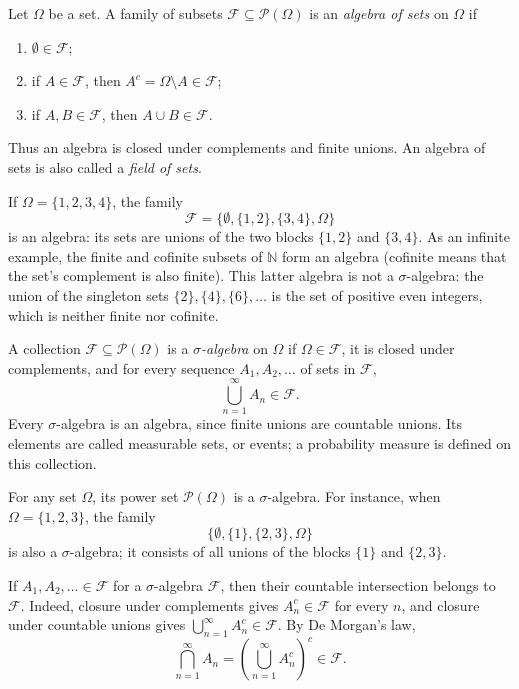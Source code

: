 \documentclass[a4paper,11pt,abstracton]{scrartcl}
\theoremstyle{dotlessP}
\theoremstyle{dotlessS}
\theoremstyle{remark}
\theoremstyle{definition}
\begin{document}
\begin{definition_box}
Let $\Omega$ be a set. A family of subsets $\mathcal{F}\subseteq\mathcal{P}(\Omega)$ is an \emph{algebra of sets} on $\Omega$ if
\begin{enumerate}
  \item $\emptyset\in\mathcal{F}$;
  \item if $A\in\mathcal{F}$, then $A^c=\Omega\setminus A\in\mathcal{F}$;
  \item if $A,B\in\mathcal{F}$, then $A\cup B\in\mathcal{F}$.
\end{enumerate}
Thus an algebra is closed under complements and finite unions.
An algebra of sets is also called a \emph{field of sets}.
\end{definition_box}

\begin{example_box}
If $\Omega=\{1,2,3,4\}$, the family
\[
  \mathcal{F}=\{\emptyset,\{1,2\},\{3,4\},\Omega\}
\]
is an algebra: its sets are unions of the two blocks $\{1,2\}$ and $\{3,4\}$. As an infinite example, the finite and cofinite subsets of $\mathbb{N}$ form an algebra (cofinite means that the set's complement is also finite). This latter algebra is not a $\sigma$-algebra: the union of the singleton sets $\{2\},\{4\},\{6\},\ldots$ is the set of positive even integers, which is neither finite nor cofinite.
\end{example_box}

\begin{definition_box}
A collection $\mathcal{F}\subseteq\mathcal{P}(\Omega)$ is a \emph{$\sigma$-algebra} on $\Omega$ if $\Omega\in\mathcal{F}$, it is closed under complements, and for every sequence $A_1,A_2,\ldots$ of sets in $\mathcal{F}$,
\[
  \bigcup_{n=1}^{\infty}A_n\in\mathcal{F}.
\]
Every $\sigma$-algebra is an algebra, since finite unions are countable unions. Its elements are called measurable sets, or events; a probability measure is defined on this collection.
\end{definition_box}

\begin{example_box}
For any set $\Omega$, its power set $\mathcal{P}(\Omega)$ is a $\sigma$-algebra. For instance, when $\Omega=\{1,2,3\}$, the family
\[
  \{\emptyset,\{1\},\{2,3\},\Omega\}
\]
is also a $\sigma$-algebra; it consists of all unions of the blocks $\{1\}$ and $\{2,3\}$.
\end{example_box}

\begin{claim_box}
If $A_1,A_2,\ldots\in\mathcal{F}$ for a $\sigma$-algebra $\mathcal{F}$, then their countable intersection belongs to $\mathcal{F}$. Indeed, closure under complements gives $A_n^c\in\mathcal{F}$ for every $n$, and closure under countable unions gives $\bigcup_{n=1}^{\infty}A_n^c\in\mathcal{F}$. By De Morgan's law,
\[
  \bigcap_{n=1}^{\infty}A_n
  =\left(\bigcup_{n=1}^{\infty}A_n^c\right)^c\in\mathcal{F}.
\]
\end{claim_box}
\end{document}
